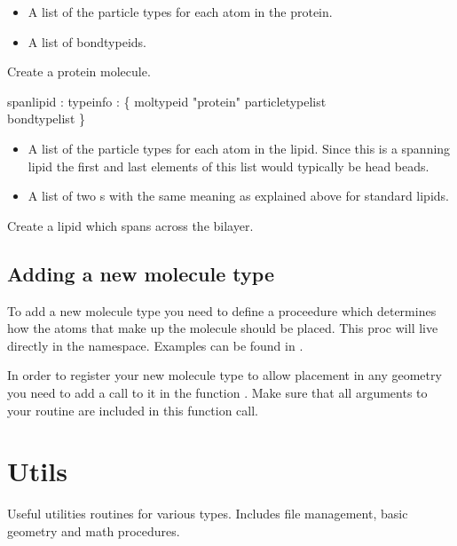 \begin{itemize}
\item {} A list of the particle types for each
  atom in the protein.
\item {} A list of bondtypeids.
\end{itemize}
Create a protein molecule.
\begin{code}
  spanlipid : typeinfo : \{ moltypeid "protein" particletypelist\\
  bondtypelist \}
\end{code}
\begin{itemize}
\item {} A list of the particle types for each
  atom in the lipid. Since this is a spanning lipid the first and last
  elements of this list would typically be head beads.
\item {} A list of two s with the same
  meaning as explained above for standard lipids.
\end{itemize}
Create a lipid which spans across the bilayer.

\subsection{Adding a new molecule type}

To add a new molecule type you need to define a proceedure which
determines how the atoms that make up the molecule should be
placed. This proc will live directly in the
 namespace. Examples
can be found in .

In order to register your new molecule type to allow placement in any
geometry you need to add a call to it in the function
. Make
sure that all arguments to your  routine are
included in this function call.


\section{Utils}

Useful utilities routines for various types. Includes file management,
basic geometry and math procedures.

